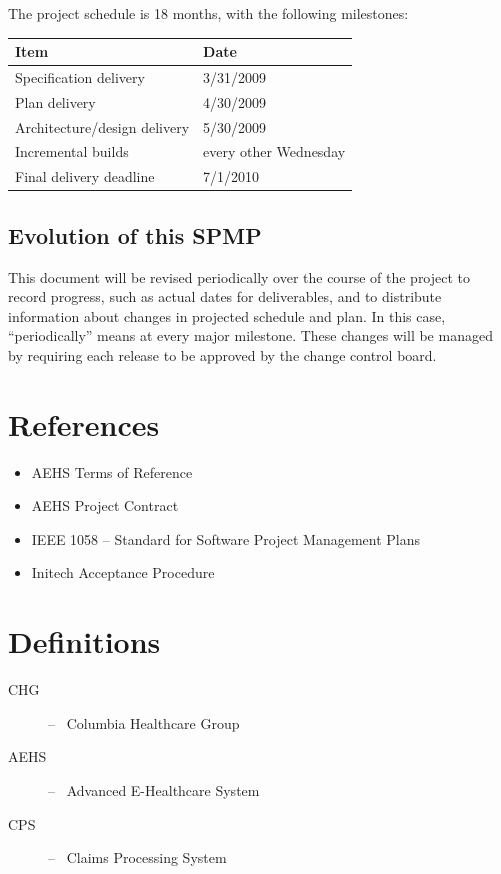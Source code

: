 \documentclass[11pt]{article}
\begin{document}
The project schedule is 18 months, with the following milestones:

\begin{center}
  \begin{tabulary}{\textwidth}{L|l}
    \bf{Item}                    & \bf{Date}             \\
    \hline \hline
    Specification delivery       & 3/31/2009             \\
    Plan delivery                & 4/30/2009             \\
    Architecture/design delivery & 5/30/2009             \\
    Incremental builds           & every other Wednesday \\
    Final delivery deadline      & 7/1/2010
  \end{tabulary}
\end{center}


\subsection{Evolution of this SPMP}
This document will be revised periodically over the course of the project to record progress, such
as actual dates for deliverables, and to distribute information about changes in projected schedule
and plan.  In this case, ``periodically'' means at every major milestone.  These changes will be
managed by requiring each release to be approved by the change control board.



\section{References}
\begin{itemize}
\item AEHS Terms of Reference
\item AEHS Project Contract
\item IEEE 1058 -- Standard for Software Project Management Plans
\item Initech Acceptance Procedure
\end{itemize}


\section{Definitions}
\begin{description}
\item[CHG] --~ Columbia Healthcare Group
\item[AEHS] --~ Advanced E-Healthcare System
\item[CPS] --~ Claims Processing System
\end{description}
\end{document}
